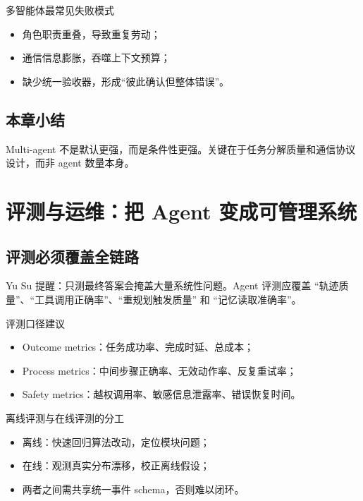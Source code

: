 \documentclass[a4paper]{article}
\begin{document}
\begin{warningbox}{多智能体最常见失败模式}
\begin{itemize}
    \item 角色职责重叠，导致重复劳动；
    \item 通信信息膨胀，吞噬上下文预算；
    \item 缺少统一验收器，形成“彼此确认但整体错误”。
\end{itemize}
\end{warningbox}

\subsection{本章小结}
Multi-agent 不是默认更强，而是条件性更强。关键在于任务分解质量和通信协议设计，而非 agent 数量本身。

\section{评测与运维：把 Agent 变成可管理系统}

\subsection{评测必须覆盖全链路}
Yu Su 提醒：只测最终答案会掩盖大量系统性问题。Agent 评测应覆盖 ``轨迹质量''、``工具调用正确率''、``重规划触发质量'' 和 ``记忆读取准确率''。

\begin{importantbox}{评测口径建议}
\begin{itemize}
    \item Outcome metrics：任务成功率、完成时延、总成本；
    \item Process metrics：中间步骤正确率、无效动作率、反复重试率；
    \item Safety metrics：越权调用率、敏感信息泄露率、错误恢复时间。
\end{itemize}
\end{importantbox}

\begin{knowledgebox}{离线评测与在线评测的分工}
\begin{itemize}
    \item 离线：快速回归算法改动，定位模块问题；
    \item 在线：观测真实分布漂移，校正离线假设；
    \item 两者之间需共享统一事件 schema，否则难以闭环。
\end{itemize}
\end{knowledgebox}
\end{document}
